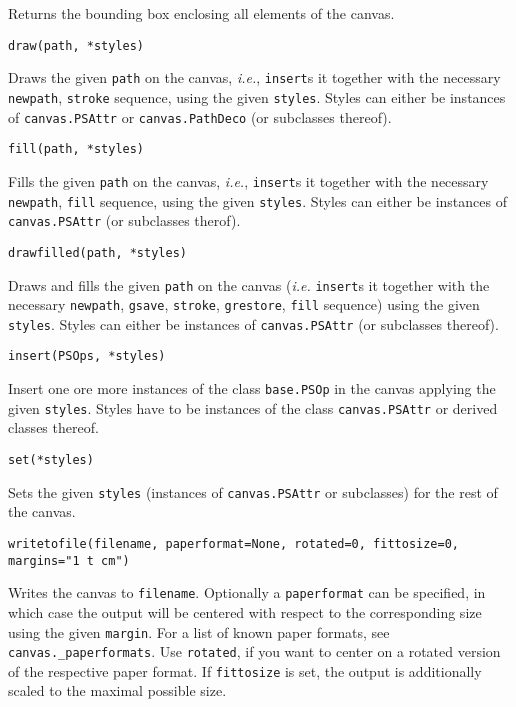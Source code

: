Returns the bounding box enclosing all elements of the canvas.

\verb|draw(path, *styles)|

Draws the given \verb|path| on the canvas, \textit{i.e.}, 
\verb|insert|s it together with the necessary \verb|newpath|,
\verb|stroke| sequence, using the given \verb|styles|. Styles can
either be instances of \verb|canvas.PSAttr| or \verb|canvas.PathDeco|
(or subclasses thereof).

\verb|fill(path, *styles)|

Fills the given \verb|path| on the canvas, \textit{i.e.},
\verb|insert|s it together with the necessary \verb|newpath|,
\verb|fill| sequence, using the given \verb|styles|. Styles can
either be instances of \verb|canvas.PSAttr| (or subclasses therof).

\verb|drawfilled(path, *styles)|

Draws and fills the given \verb|path| on the canvas (\textit{i.e.}
\verb|insert|s it together with the necessary \verb|newpath|,
\verb|gsave|, \verb|stroke|, \verb|grestore|, \verb|fill| sequence)
using the given \verb|styles|. Styles can either be instances of
\verb|canvas.PSAttr| (or subclasses thereof).



\verb|insert(PSOps, *styles)|

Insert one ore more instances of the class \verb|base.PSOp| in the
canvas applying the given \verb|styles|.  Styles have to be instances
of the class \verb|canvas.PSAttr| or derived classes thereof.

\verb|set(*styles)|

Sets the given \verb|styles| (instances of \verb|canvas.PSAttr| or
subclasses) for the rest of the canvas.

\verb|writetofile(filename, paperformat=None, rotated=0, fittosize=0, margins="1 t cm")|

Writes the canvas to \verb|filename|. Optionally a \verb|paperformat|
can be specified, in which case the output will be centered with
respect to the corresponding size using the given \verb|margin|. For a
list of known paper formats, see \verb|canvas._paperformats|. Use
\verb|rotated|, if you want to center on a rotated version of the
respective paper format. If \verb|fittosize| is set, the output is
additionally scaled to the maximal possible size.

